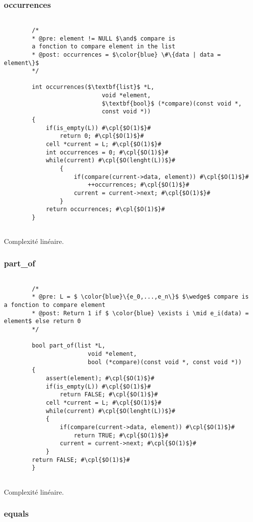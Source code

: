 \documentclass[a4paper, 11pt, oneside]{article}
\begin{document}
	\subsubsection{occurrences}
	\begin{lstlisting}[mathescape]
	
		/*
		* @pre: element != NULL $\and$ compare is 
		a fonction to compare element in the list
		* @post: occurrences = $\color{blue} \#\{data | data = element\}$
		*/
		
		int occurrences($\textbf{list}$ *L,
							void *element,
							$\textbf{bool}$ (*compare)(const void *,
		 					const void *))
		{
   			if(is_empty(L)) #\cpl{$O(1)$}#
      			return 0; #\cpl{$O(1)$}#
   			cell *current = L; #\cpl{$O(1)$}#
   			int occurrences = 0; #\cpl{$O(1)$}#
   			while(current) #\cpl{$O(lenght(L))$}#
   				{
      				if(compare(current->data, element)) #\cpl{$O(1)$}#
         				++occurrences; #\cpl{$O(1)$}#
      				current = current->next; #\cpl{$O(1)$}#
   				}
   			return occurrences; #\cpl{$O(1)$}#
		}
	
	\end{lstlisting}
	
	Complexité linéaire.
	
	\subsubsection{part\_of}
	
	\begin{lstlisting}[mathescape]
	
		/*
		* @pre: L = $ \color{blue}\{e_0,...,e_n\}$ $\wedge$ compare is a fonction to compare element
		* @post: Return 1 if $ \color{blue} \exists i \mid e_i(data) = element$ else return 0
		*/
		
		bool part_of(list *L, 
						void *element, 
						bool (*compare)(const void *, const void *))
		{
   			assert(element); #\cpl{$O(1)$}#
   			if(is_empty(L)) #\cpl{$O(1)$}#
      			return FALSE; #\cpl{$O(1)$}#
   			cell *current = L; #\cpl{$O(1)$}#
   			while(current) #\cpl{$O(lenght(L))$}#
   			{
      			if(compare(current->data, element)) #\cpl{$O(1)$}#
         			return TRUE; #\cpl{$O(1)$}#
      			current = current->next; #\cpl{$O(1)$}#
   			}
   		return FALSE; #\cpl{$O(1)$}#
		}
	
	\end{lstlisting}
	
	Complexité linéaire. 
	
	\subsubsection{equals}
	
\end{document}

